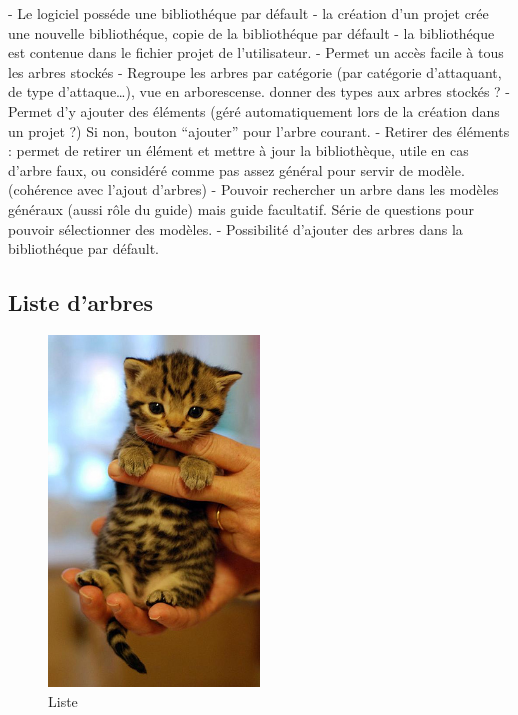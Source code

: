 		- Le logiciel posséde une bibliothéque par défault
		- la création d'un projet crée une nouvelle bibliothéque, copie de la bibliothéque par défault
		- la bibliothéque est contenue dans le fichier projet de l'utilisateur. 
		- Permet un accès facile à tous les arbres stockés
		- Regroupe les arbres par catégorie (par catégorie d’attaquant, de type d’attaque…), vue en arborescense. 	donner des types aux arbres stockés ?
		- Permet d’y ajouter des éléments (géré automatiquement lors de la création dans un projet ?) Si non, bouton “ajouter” pour l’arbre courant. 
		- Retirer des éléments : permet de retirer un élément et mettre à jour la bibliothèque, utile en cas d’arbre faux, ou considéré comme pas assez général pour servir de modèle. (cohérence avec l’ajout d’arbres)
		- Pouvoir rechercher un arbre dans les modèles généraux (aussi rôle du guide) mais guide facultatif. Série de questions pour pouvoir sélectionner des modèles.
		- Possibilité d'ajouter des arbres dans la bibliothéque par défault.

	\subsection{Liste d'arbres}
		\begin{figure}
			\begin{center}
				\includegraphics[width=0.5\textwidth]{figure/liste.png}
			\end{center}
			\caption{Liste}
			\label{fig:liste}
		\end{figure}

